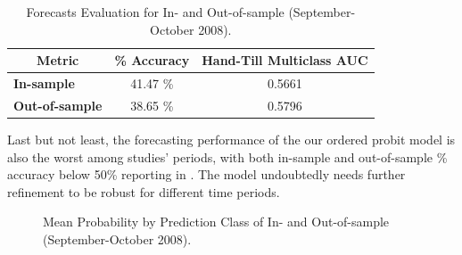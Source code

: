 \begin{table}[H]
\centering
\begin{tabular}{@{}lcc@{}}
\toprule
\multicolumn{1}{c}{Metric} & \multicolumn{1}{l}{\textbf{\% Accuracy}} & \multicolumn{1}{l}{\textbf{Hand-Till Multiclass AUC}} \\ \midrule
\textbf{In-sample}         & 41.47 \%                                 & 0.5661                                                \\
\textbf{Out-of-sample}     & 38.65 \%                                 & 0.5796                                                \\ \bottomrule
\end{tabular}
\caption{Forecasts Evaluation for In- and Out-of-sample (September-October 2008).}
\label{tab:table-29}
\end{table}

Last but not least, the forecasting performance of the our ordered probit model is also the worst among studies' periods, with both in-sample and out-of-sample \% accuracy below 50\% reporting in . The model undoubtedly needs further refinement to be robust for different time periods.






\begin{figure}[H]
    \centering
    \caption{Mean Probability by Prediction Class of In- and Out-of-sample (September-October 2008).}
    \label{fig:figure-7}
\end{figure}
